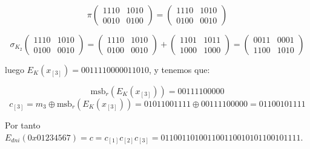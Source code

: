 \documentclass[a4paper]{article}
\begin{document}
$$\pi \begin{pmatrix} 1110 & 1010 \\ 0010 & 0100 \end{pmatrix} = \begin{pmatrix} 1110 & 1010 \\ 0100 & 0010 \end{pmatrix}$$

$$\sigma_{K_2} \begin{pmatrix} 1110 & 1010 \\ 0100 & 0010 \end{pmatrix} = \begin{pmatrix} 1110 & 1010 \\ 0100 & 0010 \end{pmatrix} + \begin{pmatrix} 1101 & 1011 \\ 1000 & 1000 \end{pmatrix} = \begin{pmatrix} 0011 & 0001 \\ 1100 & 1010 \end{pmatrix}$$


luego $E_K(x_{[3]}) = 0011 1100 0001 1010$, y tenemos que:

$$\text{msb}_r (E_K(x_{[3]})) = 0011 1100 000$$
$$c_{[3]} = m_3 \oplus \text{msb}_r(E_K(x_{[3]})) = 0101 1001 111 \oplus 0011 1100 000 = 0110 0101 111$$

Por tanto $E_{dni} (0x01234567) = c = c_{[1]}c_{[2]}c_{[3]} = 0110 0110 100 1100 1100 101 0110 0101 111$.
\end{document}
